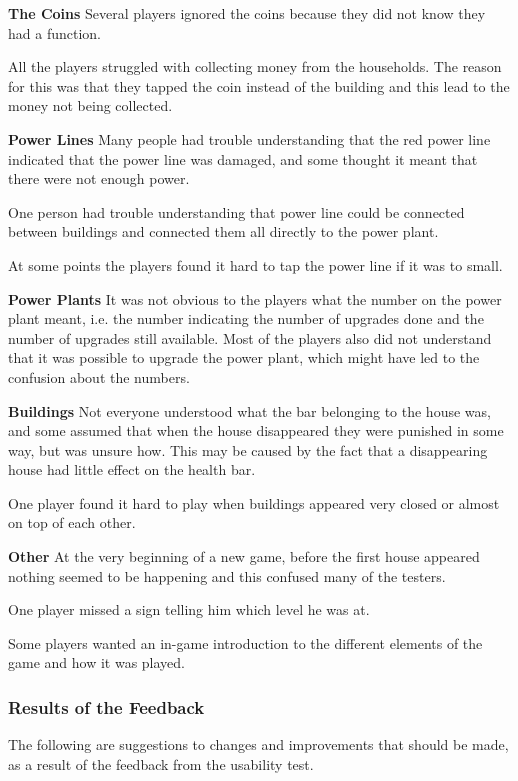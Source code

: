 		\textbf{The Coins}
			Several players ignored the coins because they did not know they had a function.

			All the players struggled with collecting money from the households. The reason for this was that they tapped the coin instead of the building and this lead to the money not being collected.

		\textbf{Power Lines}
			Many people had trouble understanding that the red power line indicated that the power line was damaged, and some thought it meant that there were not enough power.

			One person had trouble understanding that power line could be connected between buildings and connected them all directly to the power plant.

			At some points the players found it hard to tap the power line if it was to small.

		\textbf{Power Plants}
			It was not obvious to the players what the number on the power plant meant, i.e. the number indicating the number of upgrades done and the number of upgrades still available. Most of the players also did not understand that it was possible to upgrade the power plant, which might have led to the confusion about the numbers.

		\textbf{Buildings}
			Not everyone understood what the bar belonging to the house was, and some assumed that when the house disappeared they were punished in some way, but was unsure how. This may be caused by the fact that a disappearing house had little effect on the health bar.

			One player found it hard to play when buildings appeared very closed or almost on top of each other.

		\textbf{Other}
			At the very beginning of a new game, before the first house appeared nothing seemed 
			to be happening and this confused many of the testers.

			One player missed a sign telling him which level he was at.

			Some players wanted an in-game introduction to the different elements of the game and how it was played.

	\subsubsection*{Results of the Feedback}

	The following are suggestions to changes and improvements that should be made, as a result of the feedback from the usability test.

